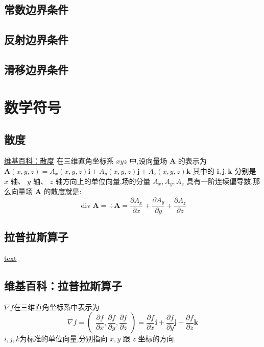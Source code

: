 \documentclass{book}
\begin{document}
\begin{example}
\begin{example}{}{}
\begin{example}
\begin{example}
\begin{example}
\subsection{常数边界条件}
\subsection{反射边界条件}
\subsection{滑移边界条件}


\section{数学符号}
\subsection{散度}
\href{https://zh.wikipedia.org/zh-hans/%E6%95%A3%E5%BA%A6}{维基百科：散度} 
在三维直角坐标系  $x y z$  中,设向量场  $\boldsymbol{A}$  的表示为
$\boldsymbol{A}(x, y, z)=A_{x}(x, y, z) \boldsymbol{i}+A_{y}(x, y, z) \boldsymbol{j}+A_{z}(x, y, z) \boldsymbol{k}$ 其中的  $\boldsymbol{i}, \boldsymbol{j}, \boldsymbol{k} $ 分别是  $x$  轴、  $y$  轴、  $z$  轴方向上的单位向量,场的分量  $A_{x}, A_{y}, A_{z}$  具有一阶连续偏导数,那么向量场  $\boldsymbol{A}$  的散度就是:
\begin{equation}
    \operatorname{div} \boldsymbol{A}=\div \boldsymbol{A}=\dfrac{\partial A_{x}}{\partial x}+\dfrac{\partial A_{y}}{\partial y}+\dfrac{\partial A_{z}}{\partial z}
\end{equation}
\subsection{拉普拉斯算子}
\href{https://zh.wikipedia.org/zh-hans/%E6%8B%89%E6%99%AE%E6%8B%89%E6%96%AF%E7%AE%97%E5%AD%90}{text}
\subsection{维基百科：拉普拉斯算子}
$\nabla f$在三维直角坐标系中表示为
\begin{equation}
    {\displaystyle \nabla f={\begin{pmatrix}{\dfrac {\partial f}{\partial x}},{\dfrac {\partial f}{\partial y}},{\dfrac {\partial f}{\partial z}}\end{pmatrix}}={\dfrac {\partial f}{\partial x}}\mathbf {i} +{\dfrac {\partial f}{\partial y}}\mathbf {j} +{\dfrac {\partial f}{\partial z}}\mathbf {k} }
\end{equation}
$i, j, k $为标准的单位向量,分别指向 $x, y$ 跟 $z$ 坐标的方向.

\end{example}
\end{example}
\end{example}
\end{example}
\end{example}
\end{document}
